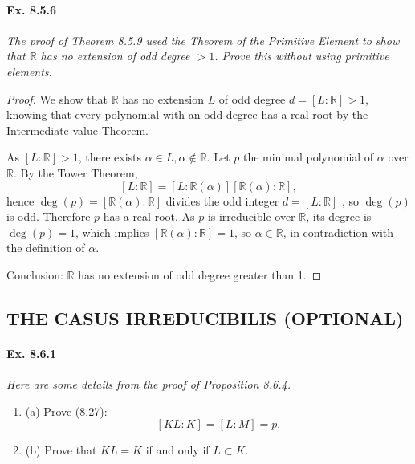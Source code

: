\documentclass[11pt,a4paper]{article}
\newcommand{\be} {\begin{enumerate}}
\newcommand{\ee} {\end{enumerate}}
\newcommand{\R}{\mathbb{R}}
\begin{document}
\paragraph{Ex. 8.5.6}

{\it The proof of Theorem 8.5.9 used the Theorem of the Primitive Element to show that $\R$ has no extension of odd degree $>1$. Prove this without using primitive elements.
}

\begin{proof}
We show that $\R$ has no extension $L$ of odd degree $d = [L:\R]>1$, knowing that every polynomial with an odd degree has a real root by the Intermediate value Theorem.

As $[L : \R] >1$, there exists $\alpha \in L , \alpha \not \in \R$. Let $p$ the minimal polynomial of $\alpha$ over $\R$. By the Tower Theorem,
$$ [L : \R] = [L : \R(\alpha)][\R(\alpha) : \R],$$ 
hence $\deg(p) =  [\R(\alpha) : \R]$ divides the odd integer $d = [L:\R]$ , so $\deg(p)$ is odd. Therefore $p$ has a real root.
As $p$ is irreducible over $\R$, its degree is $\deg(p) = 1$, which implies $ [\R(\alpha) : \R]=1$, so $\alpha \in \R$, in contradiction with the definition of $\alpha$.

Conclusion: $\R$ has no extension of odd degree greater than 1.
\end{proof}

\subsection{THE CASUS IRREDUCIBILIS (OPTIONAL)}

\paragraph{Ex. 8.6.1}

{\it Here are some details from the proof of Proposition 8.6.4.
\be
\item[(a)] Prove (8.27):
$$[KL : K] = [L:M] = p.$$
\item[(b)] Prove that $KL = K$ if and only if $L\subset K$.
\ee
}
\end{document}
